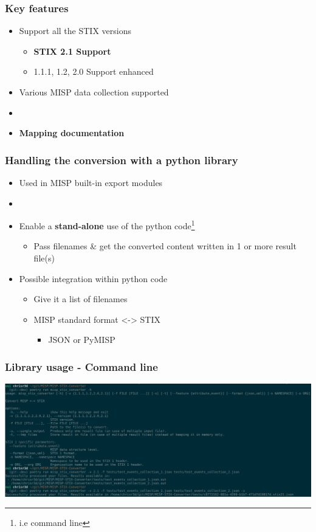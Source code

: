 \begin{frame}
    \frametitle{Key features}
    \begin{itemize}
        \item Support all the STIX versions
        \begin{itemize}
            \item {\bf STIX 2.1 Support}
            \item 1.1.1, 1.2, 2.0 Support enhanced
        \end{itemize}
        \item Various MISP data collection supported
        \item[]
        \item {\bf Mapping documentation}
    \end{itemize}
\end{frame}

\begin{frame}
    \frametitle{Handling the conversion with a python library}
    \begin{itemize}
        \item Used in MISP built-in export modules
        \item []
        \item Enable a {\bf stand-alone} use of the python code\footnote{i.e command line}
        \begin{itemize}
            \item Pass filenames \& get the converted content written in 1 or more result file(s)
        \end{itemize}
        \item Possible integration within python code
        \begin{itemize}
            \item Give it a list of filenames
            \item MISP standard format <-> STIX
            \begin{itemize}
                \item JSON or PyMISP
            \end{itemize}
        \end{itemize}
    \end{itemize}
\end{frame}

\begin{frame}
    \frametitle{Library usage - Command line}
    \centering
    \includegraphics[scale=0.145]{images/stand_alone_usage.png}
\end{frame}

